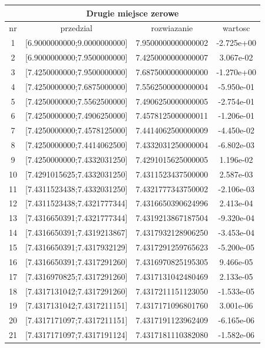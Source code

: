 \documentclass[polish, 11pt, oneside]{article}   	%
\begin{document}
\begin{center}
\begin{tabular}{ |c|c|c|c| } 
\hline
\multicolumn{4}{|c|}{Drugie miejsce zerowe} \\
 \hline
 nr & przedzial & rozwiazanie & wartosc \\
 \hline
 1 & [6.9000000000;9.0000000000] & 7.9500000000000002 &   -2.725e+00 \\ 
  2 & [6.9000000000;7.9500000000] & 7.4250000000000007 &    3.067e-02 \\ 
  3 & [7.4250000000;7.9500000000] & 7.6875000000000000 &   -1.270e+00 \\ 
  4 & [7.4250000000;7.6875000000] & 7.5562500000000004 &   -5.950e-01 \\ 
  5 & [7.4250000000;7.5562500000] & 7.4906250000000005 &   -2.754e-01 \\ 
  6 & [7.4250000000;7.4906250000] & 7.4578125000000011 &   -1.206e-01 \\ 
  7 & [7.4250000000;7.4578125000] & 7.4414062500000009 &   -4.450e-02 \\ 
  8 & [7.4250000000;7.4414062500] & 7.4332031250000004 &   -6.802e-03 \\ 
  9 & [7.4250000000;7.4332031250] & 7.4291015625000005 &    1.196e-02 \\ 
 10 & [7.4291015625;7.4332031250] & 7.4311523437500000 &    2.587e-03 \\ 
 11 & [7.4311523438;7.4332031250] & 7.4321777343750002 &   -2.106e-03 \\ 
 12 & [7.4311523438;7.4321777344] & 7.4316650390624996 &    2.413e-04 \\ 
 13 & [7.4316650391;7.4321777344] & 7.4319213867187504 &   -9.320e-04 \\ 
 14 & [7.4316650391;7.4319213867] & 7.4317932128906250 &   -3.453e-04 \\ 
 15 & [7.4316650391;7.4317932129] & 7.4317291259765623 &   -5.200e-05 \\ 
 16 & [7.4316650391;7.4317291260] & 7.4316970825195305 &    9.466e-05 \\ 
 17 & [7.4316970825;7.4317291260] & 7.4317131042480469 &    2.133e-05 \\ 
 18 & [7.4317131042;7.4317291260] & 7.4317211151123050 &   -1.533e-05 \\ 
 19 & [7.4317131042;7.4317211151] & 7.4317171096801760 &    3.001e-06 \\ 
 20 & [7.4317171097;7.4317211151] & 7.4317191123962409 &   -6.165e-06 \\ 
 21 & [7.4317171097;7.4317191124] & 7.4317181110382080 &   -1.582e-06 \\ 

\end{tabular}
\end{center}
\end{document}
